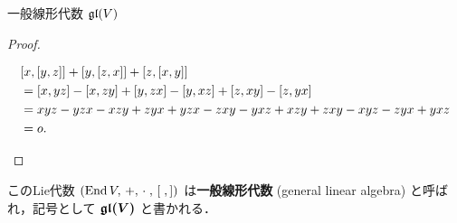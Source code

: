 \documentclass[rep_main]{subfiles}
\begin{document}
\begin{myexample}[label=def:gl-alg]{一般線形代数 $\mathfrak{gl} (V)$}
\begin{proof}
\begin{description}
            \begin{align}
                &\comm{x}{\comm{y}{z}} + \comm{y}{\comm{z}{x}} + \comm{z}{\comm{x}{y}} \\
                &= \comm{x}{yz} - \comm{x}{zy} + \comm{y}{zx} - \comm{y}{xz} + \comm{z}{xy} - \comm{z}{yx} \\
                &= xyz - yzx - xzy + zyx + yzx - zxy - yxz + xzy + zxy - xyz - zyx + yxz \\
                &= o.
            \end{align}
        \end{description}
    \end{proof}
    
    このLie代数 $(\End V,\, +,\, \cdot\;,\, \comm{\;}{\,})$ は\textbf{一般線形代数} (general linear algebra) と呼ばれ，記号として $\bm{\mathfrak{gl} (V)}$ と書かれる．


\end{myexample}
\end{document}
